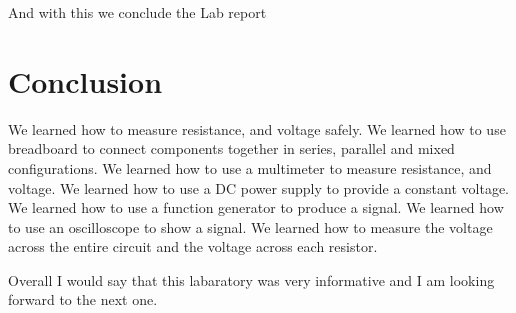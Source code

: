 \documentclass[a4paper, 10pt]{article}
\begin{document}
					And with this we conclude the Lab report

	\section{Conclusion}
		We learned how to measure resistance, and voltage safely.
		We learned how to use breadboard to connect components together in series, parallel and mixed configurations.
		We learned how to use a multimeter to measure resistance, and voltage.
		We learned how to use a DC power supply to provide a constant voltage.
		We learned how to use a function generator to produce a signal.
		We learned how to use an oscilloscope to show a signal.
		We learned how to measure the voltage across the entire circuit and the voltage across each resistor.
		
	    \vspace{5mm}
		\noindent Overall I would say that this labaratory was very informative and I am looking forward to the next one.
\end{document}
